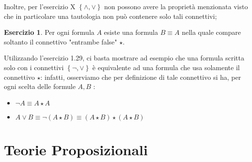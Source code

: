 \documentclass[a4paper]{article}
\theoremstyle{definition}
\theoremstyle{definition}
\theoremstyle{remark}
\theoremstyle{definition}
\newtheorem{exercise}{Esercizio}[section]
\begin{document}
Inoltre, per l'esercizio X $\left\{ \land,\lor \right\} $ non possono avere la proprietà menzionata visto che in particolare una tautologia non può contenere solo tali connettivi;
\setcounter{exercise}{30}
\begin{exercise}
	Per ogni formula $A$ esiste una formula $B\equiv A$ nella quale compare soltanto il connettivo "entrambe false" $\star$.
\end{exercise}
Utilizzando l'esercizio 1.29, ci basta mostrare ad esempio che una formula scritta solo con i connettivi $\left\{ \lnot,\lor \right\}$ è equivalente ad una formula che usa solamente il connettivo $\star$: infatti, osserviamo che per
definizione di tale connettivo si ha, per ogni scelta delle formule $A,B$ :
\begin{itemize}
	\item $\lnot A\equiv A\star A$
	\item $A\lor B\equiv\lnot\left( A\star B \right) \equiv \left( A\star B \right) \star\left( A\star B \right) $
\end{itemize}
\section{Teorie Proposizionali}
\end{document}
